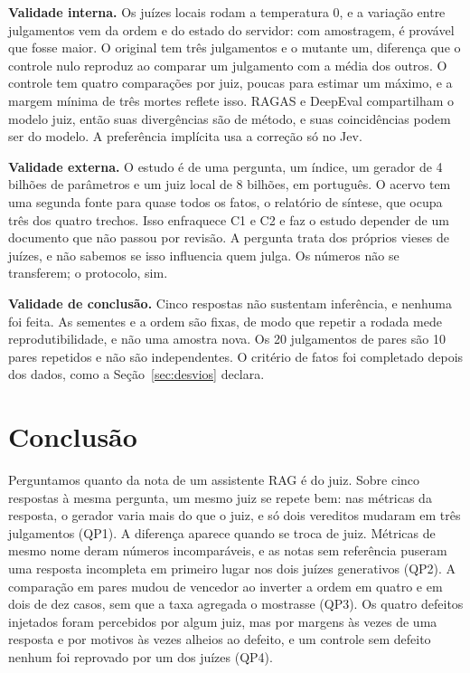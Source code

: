 \documentclass[12pt]{article}
\begin{document}
\textbf{Validade interna.} Os juízes locais rodam a temperatura 0, e a variação entre
julgamentos vem da ordem e do estado do servidor: com amostragem, é provável que fosse maior. O original tem três julgamentos e o mutante um, diferença que o controle
nulo reproduz ao comparar um julgamento com a média dos outros. O controle tem quatro
comparações por juiz, poucas para estimar um máximo, e a margem mínima de três mortes
reflete isso. RAGAS e DeepEval compartilham o modelo juiz, então suas divergências são de
método, e suas coincidências podem ser do modelo. A preferência implícita usa a correção
só no Jev.

\textbf{Validade externa.} O estudo é de uma pergunta, um índice, um gerador de 4 bilhões
de parâmetros e um juiz local de 8 bilhões, em português. O acervo tem uma segunda fonte
para quase todos os fatos, o relatório de síntese, que ocupa três dos quatro trechos. Isso
enfraquece C1 e C2 e faz o estudo depender de um documento que não passou por revisão. A
pergunta trata dos próprios vieses de juízes, e não sabemos se isso influencia quem julga. Os
números não se transferem; o protocolo, sim.

\textbf{Validade de conclusão.} Cinco respostas não sustentam inferência, e nenhuma foi
feita. As sementes e a ordem são fixas, de modo que repetir a rodada mede reprodutibilidade,
e não uma amostra nova. Os 20 julgamentos de pares são 10 pares repetidos e não são
independentes. O critério de fatos foi completado depois dos dados, como a
Seção~\ref{sec:desvios} declara.

\section{Conclusão}

Perguntamos quanto da nota de um assistente RAG é do juiz. Sobre cinco respostas à mesma
pergunta, um mesmo juiz se repete bem: nas métricas da resposta, o gerador varia mais do que
o juiz, e só dois vereditos mudaram em três julgamentos (QP1). A diferença aparece quando se
troca de juiz. Métricas de mesmo nome deram números incomparáveis, e as notas sem referência
puseram uma resposta incompleta em primeiro lugar nos dois juízes generativos (QP2). A comparação em pares mudou de vencedor
ao inverter a ordem em quatro e em dois de dez casos, sem que a taxa agregada o mostrasse
(QP3). Os quatro defeitos injetados foram percebidos por algum juiz, mas por margens às vezes
de uma resposta e por motivos às vezes alheios ao defeito, e um controle sem defeito nenhum
foi reprovado por um dos juízes (QP4).
\end{document}
